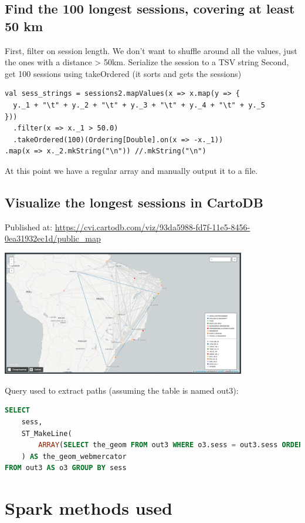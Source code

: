 \documentclass[abstract=on]{article}
\begin{document}
\subsection{Find the 100 longest sessions, covering at least 50 km}
First, filter on session length. We don't want to shuffle around all the values, just the ones with a distance > 50km.
Serialize the session to a TSV string
Second, get 100 sessions using takeOrdered (it sorts and gets the sessions)
\begin{lstlisting}
val sess_strings = sessions2.mapValues(x => x.map(y => {
  y._1 + "\t" + y._2 + "\t" + y._3 + "\t" + y._4 + "\t" + y._5
}))
  .filter(x => x._1 > 50.0)
  .takeOrdered(100)(Ordering[Double].on(x => -x._1))
.map(x => x._2.mkString("\n")) //.mkString("\n")
\end{lstlisting}
At this point we have a regular array and manually output it to a file.


\subsection{Visualize the longest sessions in CartoDB}
Published at:
\url{https://cvi.cartodb.com/viz/93da5988-fd7f-11e5-8456-0ea31932ec1d/public_map}
\begin{center}
\includegraphics[width=0.8\textwidth]{carto.png}
\end{center}

Query used to extract paths (assuming the table is named out3):
\begin{lstlisting}[language=SQL]
SELECT
    sess,
    ST_MakeLine(
        ARRAY(SELECT the_geom FROM out3 WHERE o3.sess = out3.sess ORDER BY DATE ASC)
    ) AS the_geom_webmercator
FROM out3 AS o3 GROUP BY sess
\end{lstlisting}

\section{Spark methods used}
\end{document}
